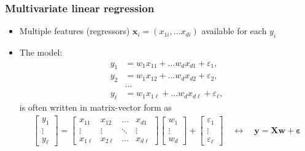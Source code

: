 \documentclass[usenames,dvipsnames,aspectratio=169]{beamer}
\begin{document}
\begin{frame}
\frametitle{Multivariate linear regression}

\begin{itemize}

\item Multiple features (regressors)
$\mathbf{x}_i = (x_{1i}, \ldots x_{d i})$
available for each $y_i$

\item The model: 
\vspace{-5mm}
\begin{align*}
y_1 &= w_1 x_{11} + \ldots w_d x_{d1} + \varepsilon_1, \\
y_2 &= w_1 x_{12} + \ldots w_d x_{d2} + \varepsilon_2, \\
& \ldots \\
y_{\ell} &= w_1 x_{1 \ell} + \ldots w_d x_{d \ell} + \varepsilon_{\ell}, 
\end{align*}
is often written in matrix-vector form as
\begin{align*}
\begin{bmatrix}
y_1 \\
\vdots \\
y_{\ell}
\end{bmatrix}
 = 
\begin{bmatrix}
    x_{11} & x_{12} & \dots  & x_{d1} \\
    \vdots & \vdots & \ddots & \vdots \\
    x_{1 \ell} & x_{2 \ell} & \dots  & x_{d \ell}
\end{bmatrix}
\begin{bmatrix}
w_1 \\
\vdots \\
w_d
\end{bmatrix}
+ 
\begin{bmatrix}
\varepsilon_1 \\
\vdots \\
\varepsilon_{\ell}
\end{bmatrix}
\quad \longleftrightarrow \quad 
\bm{y} = \bm{X} \mathbf{w} + \bm{\varepsilon}
\end{align*}

\end{itemize}

\end{frame}
\end{document}
